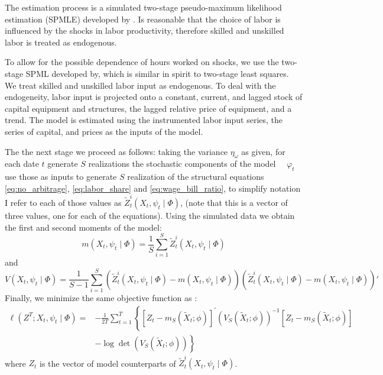 \documentclass[12pt]{article}
\begin{document}
The estimation process is a simulated two-stage pseudo-maximum likelihood estimation (SPMLE) developed by \citep{white1996estimation}. Is reasonable that the choice of labor is influenced by the shocks in labor productivity, therefore skilled and unskilled labor is treated as endogenous. 

To allow for the possible dependence of hours worked on shocks, we use the two-stage SPML developed by, which is similar in spirit to two-stage least squares. We treat skilled and unskilled labor input as endogenous. To deal with the endogeneity, labor input is projected onto a constant, current, and lagged stock of capital equipment and structures, the lagged relative price of equipment, and a trend. The model is estimated using the instrumented labor input series, the series of capital, and prices as the inputs of the model.

The the next stage we proceed as follows: taking the variance $\eta_\omega$ as given, for each date $t$ generate $S$ realizations the stochastic components of the model $\quad \varphi_t$ use those as inputs to generate $S$ realization of the structural equations \eqref{eq:no_arbitrage}, \eqref{eq:labor_share} and \eqref{eq:wage_bill_ratio}, to simplify notation I refer to each of those values as $\tilde{Z}^{i}_t(X_{t}, \psi_{t} \mid \Phi)$, (note that this is a vector of three values, one for each of the equations). Using the simulated data we obtain the first and second moments of the model: 
\begin{equation}\label{eq:first_moment}
 m(X_{t}, \psi_{t} \mid \Phi) = \frac{1}{S}\sum_{i=1}^S \tilde{Z}^{i}_t(X_{t}, \psi_{t} \mid \Phi)
\end{equation}
and
\begin{equation}\label{eq:second_moment}
 V(X_{t}, \psi_{t} \mid \Phi) = \frac{1}{S-1}\sum_{i=1}^S \left( \tilde{Z}^{i}_t(X_{t}, \psi_{t} \mid \Phi) - m(X_{t}, \psi_{t} \mid \Phi) \right) \left( \tilde{Z}^{i}_t(X_{t}, \psi_{t} \mid \Phi) - m(X_{t}, \psi_{t} \mid \Phi) \right)'
\end{equation}
Finally, we minimize the same objective function as \citep{krusell2000capital}:
\begin{equation}\label{eq:objective_funct_estimation}
 \begin{aligned}
 \ell\left(Z^{T} ; X_{t}, \psi_{t} \mid \Phi\right)=&-\frac{1}{2 T} \sum_{t=1}^{T}\left\{\left[Z_{t}-m_{S}\left(\tilde{X}_{t} ; \phi\right)\right]^{\prime}\left(V_{S}\left(\tilde{X}_{t} ; \phi\right)\right)^{-1}\left[Z_{t}-m_{S}\left(\tilde{X}_{t} ; \phi\right)\right]\right.\\
 &\left.-\log \operatorname{det}\left(V_{S}\left(\tilde{X}_{t} ; \phi\right)\right)\right\}
 \end{aligned} 
\end{equation}
where $Z_{t}$ is the vector of model counterparts of $\tilde{Z}^{i}_t(X_{t}, \psi_{t} \mid \Phi)$.
\end{document}
